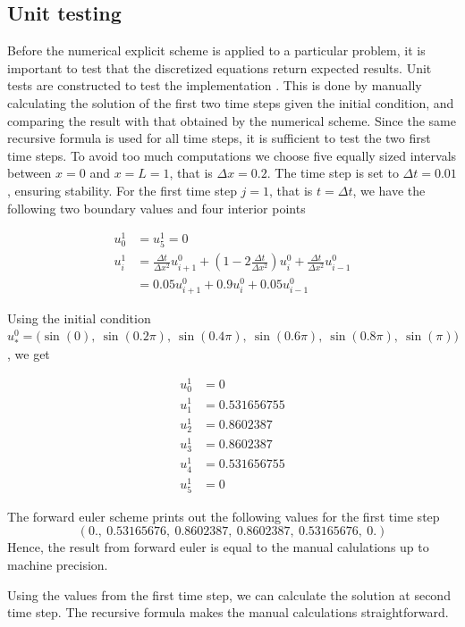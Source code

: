 \documentclass[12pt]{extarticle}
\begin{document}
\subsection*{Unit testing}
Before the numerical explicit scheme is applied to a particular problem, it is important to test that the discretized equations return expected results. Unit tests are constructed to test the implementation . This is done by manually calculating the solution of the first two time steps given the initial condition, and comparing the result with that obtained by the numerical scheme. Since the same recursive formula is used for all time steps, it is sufficient to test the two first time steps. To avoid too much computations we choose five equally sized intervals between $x=0$ and $x=L=1$, that is $\Delta x = 0.2$. The time step is set to $\Delta t = 0.01$, ensuring stability.
For the first time step $j=1$, that is $t=\Delta t$, we have the following two boundary values and four interior points

\begin{align*}
	u_0^1 &= u_5^1 = 0 \\
	u_i^1 &= \frac{\Delta t}{\Delta x^2}u_{i+1}^0 + (1 - 2\frac{\Delta t}{\Delta x^2})u_i^0 + \frac{\Delta t}{\Delta x^2}u_{i-1}^0 \\
	&= 0.05u_{i+1}^0 + 0.9u_i^0 + 0.05u_{i-1}^0
\end{align*}

Using the initial condition $u_*^0 = \big(\sin(0),\:\sin(0.2\pi),\:\sin(0.4\pi),\:\sin(0.6\pi), \:\sin(0.8\pi),\:\sin(\pi)\big)$, we get

\begin{align*}
	u_0^1 &= 0 \\
	u_1^1 &= 0.531656755 \\
	u_2^1 &= 0.8602387 \\
	u_3^1 &= 0.8602387 \\
	u_4^1 &= 0.531656755 \\
	u_5^1 &= 0
\end{align*}

The forward euler scheme prints out the following values for the first time step
\[ (0.,\:         0.53165676,\: 0.8602387,\:  0.8602387,\:  0.53165676,\: 0.        ) \]
Hence, the result from forward euler is equal to the manual calulations up to machine precision.

\par Using the values from the first time step, we can calculate the solution at second time step. The recursive formula makes the manual calculations straightforward.
\end{document}
